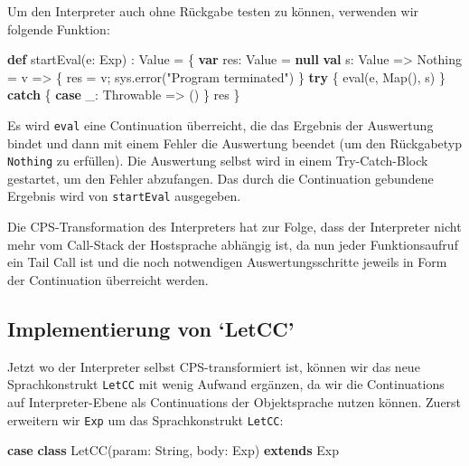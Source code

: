 \documentclass[]{article}
\newenvironment{Shaded}{}{}
\newcommand{\FunctionTok}[1]{\textcolor[rgb]{0.02,0.16,0.49}{#1}}
\newcommand{\KeywordTok}[1]{\textcolor[rgb]{0.00,0.44,0.13}{\textbf{#1}}}
\newcommand{\NormalTok}[1]{#1}
\newcommand{\StringTok}[1]{\textcolor[rgb]{0.25,0.44,0.63}{#1}}
\begin{document}
Um den Interpreter auch ohne Rückgabe testen zu können, verwenden wir
folgende Funktion:

\begin{Shaded}
\begin{Highlighting}[]
\KeywordTok{def} \FunctionTok{startEval}\NormalTok{(e: Exp) : Value = \{}
  \KeywordTok{var}\NormalTok{ res: Value = }\KeywordTok{null}
  \KeywordTok{val}\NormalTok{ s: Value =\textgreater{} Nothing = v =\textgreater{} \{ res = v; sys.}\FunctionTok{error}\NormalTok{(}\StringTok{"Program terminated"}\NormalTok{) \}}
  \KeywordTok{try}\NormalTok{ \{ }\FunctionTok{eval}\NormalTok{(e, Map(), s) \} }\KeywordTok{catch}\NormalTok{ \{ }\KeywordTok{case}\NormalTok{ \_: Throwable =\textgreater{} () \}}
\NormalTok{  res}
\NormalTok{\}}
\end{Highlighting}
\end{Shaded}

Es wird \texttt{eval} eine Continuation überreicht, die das Ergebnis der
Auswertung bindet und dann mit einem Fehler die Auswertung beendet (um
den Rückgabetyp \texttt{Nothing} zu erfüllen). Die Auswertung selbst
wird in einem Try-Catch-Block gestartet, um den Fehler abzufangen. Das
durch die Continuation gebundene Ergebnis wird von \texttt{startEval}
ausgegeben.

Die CPS-Transformation des Interpreters hat zur Folge, dass der
Interpreter nicht mehr vom Call-Stack der Hostsprache abhängig ist, da
nun jeder Funktionsaufruf ein Tail Call ist und die noch notwendigen
Auswertungsschritte jeweils in Form der Continuation überreicht werden.

\hypertarget{implementierung-von-letcc}{%
\subsection{Implementierung von
`LetCC'}\label{implementierung-von-letcc}}

Jetzt wo der Interpreter selbst CPS-transformiert ist, können wir das
neue Sprachkonstrukt \texttt{LetCC} mit wenig Aufwand ergänzen, da wir
die Continuations auf Interpreter-Ebene als Continuations der
Objektsprache nutzen können. Zuerst erweitern wir \texttt{Exp} um das
Sprachkonstrukt \texttt{LetCC}:

\begin{Shaded}
\begin{Highlighting}[]
\KeywordTok{case} \KeywordTok{class} \FunctionTok{LetCC}\NormalTok{(param: String, body: Exp) }\KeywordTok{extends}\NormalTok{ Exp}
\end{Highlighting}
\end{Shaded}
\end{document}
